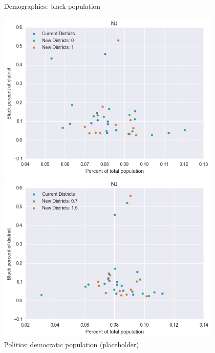\begin{figure}[htb!] \centering
\caption{ Demographics: black population }
\includegraphics[width=4.5in]{../analysis/NJ/analysis_scatter.png}
\caption{ Politics: democratic population (placeholder)}
\includegraphics[width=4.5in]{../analysis/NJ/analysis_scatter2.png}
\end{figure}

\clearpage
\newpage

